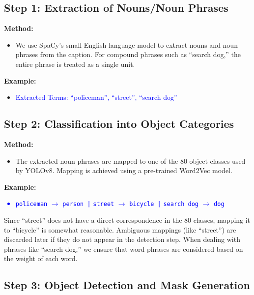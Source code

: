\documentclass[11pt,letterpaper]{article}
\begin{document}
\subsection*{Step 1: Extraction of Nouns/Noun Phrases}

\textbf{Method:} 
\begin{itemize}
  \item We use SpaCy's small English language model to extract nouns and noun phrases from the caption. For compound phrases such as ``search dog,'' the entire phrase is treated as a single unit.
\end{itemize}

\noindent
\textbf{Example:}
\begin{itemize}
  \item \textcolor{blue}{ Extracted Terms: ``policeman'', ``street'', ``search dog''}
\end{itemize}


\subsection*{Step 2: Classification into Object Categories}

\textbf{Method:}
\begin{itemize}
  \item The extracted noun phrases are mapped to one of the 80 object classes used by YOLOv8. Mapping is achieved using a pre-trained Word2Vec model.
\end{itemize}

\noindent
\textbf{Example:}
\textcolor{blue}{\begin{itemize}
  \item \texttt{policeman} $\to$ \texttt{person |}
  \texttt{street} $\to$ \texttt{bicycle |}
  \texttt{search dog} $\to$ \texttt{dog}
\end{itemize}}

\noindent
Since ``street'' does not have a direct correspondence in the 80 classes, mapping it to ``bicycle'' is somewhat reasonable. Ambiguous mappings (like ``street'') are discarded later if they do not appear in the detection step. When dealing with phrases like ``search dog,'' we ensure that word phrases are considered based on the weight of each word.


\subsection*{Step 3: Object Detection and Mask Generation}
\end{document}
